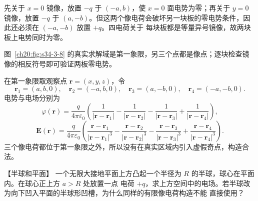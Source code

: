 {\begin{xesolution}
先关于 $x=0$ 镜像，放置 $-q$ 于 $(-a,b)$，使 $x=0$ 面电势为零；再关于 $y=0$ 镜像，放置 $-q$ 于
$(a,-b)$。但这两个像电荷会破坏另一块板的零电势条件，因此还必须在 $(-a,-b)$ 放置 $+q$。四电荷关于
每块板都是等量异号镜像，故两块板上电势同时为零。

图~\ref{ch20:fig:s34-3-8} 的真实求解域是第一象限，另三个点都是像点；逐块检查镜像的相反符号即可验证两板零电势。

\par\noindent\begin{minipage}{\linewidth}
\cornerImagesFigure
{}\label{ch20:fig:s34-3-8}
\end{minipage}\par\medskip

在第一象限取观察点 $\boldsymbol r=(x,y,z)$，令
\[
  \boldsymbol r_1=(a,b,0),\quad
  \boldsymbol r_2=(-a,b,0),\quad
  \boldsymbol r_3=(a,-b,0),\quad
  \boldsymbol r_4=(-a,-b,0).
\]
电势与电场分别为
\[
  \boxed{\varphi(\boldsymbol r)=\frac q{4\pi\varepsilon_0}
  \left(\frac1{|\boldsymbol r-\boldsymbol r_1|}
  -\frac1{|\boldsymbol r-\boldsymbol r_2|}
  -\frac1{|\boldsymbol r-\boldsymbol r_3|}
  +\frac1{|\boldsymbol r-\boldsymbol r_4|}\right)},
\]
\[
  \boxed{\boldsymbol E(\boldsymbol r)=\frac q{4\pi\varepsilon_0}
  \left(\frac{\boldsymbol r-\boldsymbol r_1}{|\boldsymbol r-\boldsymbol r_1|^3}
  -\frac{\boldsymbol r-\boldsymbol r_2}{|\boldsymbol r-\boldsymbol r_2|^3}
  -\frac{\boldsymbol r-\boldsymbol r_3}{|\boldsymbol r-\boldsymbol r_3|^3}
  +\frac{\boldsymbol r-\boldsymbol r_4}{|\boldsymbol r-\boldsymbol r_4|^3}\right)}.
\]
三个像电荷都位于第一象限之外，所以没有在真实区域内引入虚假奇点，构造合法。
\end{xesolution}



\begin{origexamplebox}{【半球和平面】}\label{ch20:ex:s34-3-8}
一个无限大接地平面上方凸起一个半径为 $R$ 的半球，球心在平面内。在球心正上方 $a>R$ 处放置一点
电荷 $+q$，求上方空间中的电场。若半球改为向下凹入平面的半球形凹槽，为什么同样的有限像电荷构造不能
直接使用？
\par\noindent\begin{minipage}{\linewidth}
\emHemisphereQuestion
{}\label{ch20:fig:em-source-thirty-fourth-section-8}
\end{minipage}\par\medskip
\end{origexamplebox}\par\nopagebreak[4]

}
